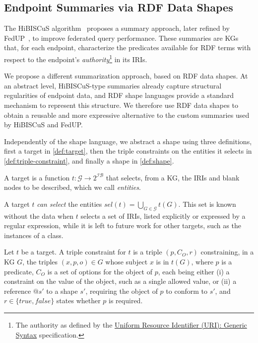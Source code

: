 \subsection{Endpoint Summaries via RDF Data Shapes}\label{sec:summaries}

The HiBISCuS algorithm~\cite{saleem2014hibiscus} proposes a summary approach, later refined by FedUP~\cite{aimonierdavat:hal-04538238}, to improve federated query performance.
These summaries are \acp{KG} that, for each endpoint, characterize the predicates available for \ac{RDF} terms with respect to the endpoint's \emph{authority}\footnote{The authority as defined by the \href{https://datatracker.ietf.org/doc/html/rfc3986}{Uniform Resource Identifier (URI): Generic Syntax} specification.} in its \acp{IRI}.

We propose a different summarization approach, based on \ac{RDF} data shapes.
At an abstract level, HiBISCuS-type summaries already capture structural regularities of endpoint data, and \ac{RDF} shape languages provide a standard mechanism to represent this structure.
We therefore use \ac{RDF} data shapes to obtain a reusable and more expressive alternative to the custom summaries used by HiBISCuS and FedUP.

Independently of the shape language, we abstract a shape using three definitions,
first a target in \cref{def:target},
then the triple constraints on the entities it selects in \cref{def:triple-constraint},
and finally a shape in \cref{def:shape}.

\begin{definition}[Target]\label{def:target}
A target is a function $t : \mathcal{G} \to 2^{\mathcal{I}\mathcal{B}}$ that selects, from a \ac{KG}, the \acp{IRI} and blank nodes to be described, which we call \emph{entities}.
\end{definition}

A target $t$ \emph{can select} the entities $\mathit{sel}(t) = \bigcup_{G \in \mathcal{G}} t(G)$.
This set is known without the data when $t$ selects a set of \acp{IRI}, listed explicitly or expressed by a regular expression,
while it is left to future work for other targets, such as the instances of a class.

\begin{definition}\label{def:triple-constraint}
Let $t$ be a target.
A triple constraint for $t$ is a triple $(p, C_O, r)$ constraining, in a \ac{KG} $G$, the triples $(x, p, o) \in G$ whose subject $x$ is in $t(G)$, where $p$ is a predicate,
$C_O$ is a set of options for the object of $p$, each being either
(i) a constraint on the value of the object, such as a single allowed value, or
(ii) a reference $@s'$ to a shape $s'$, requiring the object of $p$ to conform to $s'$,
and $r \in \{\mathit{true}, \mathit{false}\}$ states whether $p$ is required.
\end{definition}

